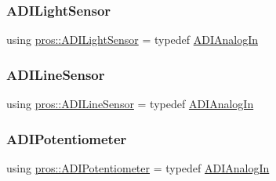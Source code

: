 \mbox{\label{namespacepros_a105b1224da9401cb8b6949713841fed7}} 
\subsubsection{\texorpdfstring{ADILightSensor}{ADILightSensor}}
{\footnotesize\ttfamily using \mbox{\hyperlink{namespacepros_a105b1224da9401cb8b6949713841fed7}{pros\+::\+A\+D\+I\+Light\+Sensor}} = typedef \mbox{\hyperlink{classpros_1_1ADIAnalogIn}{A\+D\+I\+Analog\+In}}}

\mbox{\label{namespacepros_a70a7be425ae5e39c353db03e14d62e9a}} 
\subsubsection{\texorpdfstring{ADILineSensor}{ADILineSensor}}
{\footnotesize\ttfamily using \mbox{\hyperlink{namespacepros_a70a7be425ae5e39c353db03e14d62e9a}{pros\+::\+A\+D\+I\+Line\+Sensor}} = typedef \mbox{\hyperlink{classpros_1_1ADIAnalogIn}{A\+D\+I\+Analog\+In}}}

\mbox{\label{namespacepros_a49b07257293eca610437130d01c47b89}} 
\subsubsection{\texorpdfstring{ADIPotentiometer}{ADIPotentiometer}}
{\footnotesize\ttfamily using \mbox{\hyperlink{namespacepros_a49b07257293eca610437130d01c47b89}{pros\+::\+A\+D\+I\+Potentiometer}} = typedef \mbox{\hyperlink{classpros_1_1ADIAnalogIn}{A\+D\+I\+Analog\+In}}}

